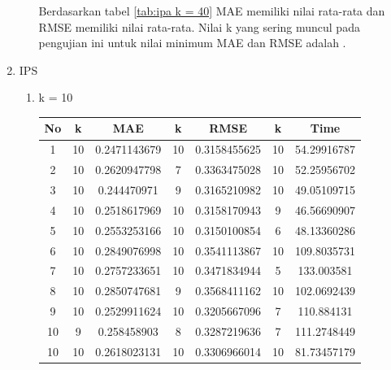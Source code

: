 \begin{enumerate}
\begin{enumerate}
                Berdasarkan tabel \ref{tab:ipa k = 40} MAE memiliki nilai rata-rata dan RMSE memiliki nilai rata-rata. Nilai k yang sering muncul pada pengujian ini untuk nilai minimum MAE dan RMSE adalah .
                
        \end{enumerate}
        
        
        
    \item IPS
        \begin{enumerate}
            \item k = 10 \\
                \begin{longtable}[H]{|c|c|c|c|c|c|c|}
                    \hline
                    No & k & MAE & k & RMSE & k & Time \\
                    \hline
                    1 & 10 & 0.2471143679 & 10 & 0.3158455625 & 10 & 54.29916787\\
                    \hline
                    2 & 10 & 0.2620947798 & 7 & 0.3363475028 & 10 & 52.25956702\\
                    \hline
                    3 & 10 & 0.244470971 & 9 & 0.3165210982 & 10 & 49.05109715\\
                    \hline
                    4 & 10 & 0.2518617969 & 10 & 0.3158170943 & 9 & 46.56690907\\
                    \hline
                    5 & 10 & 0.2553253166 & 10 & 0.3150100854 & 6 & 48.13360286\\
                    \hline
                    6 & 10 & 0.2849076998 & 10 & 0.3541113867 & 10 & 109.8035731\\
                    \hline
                    7 & 10 & 0.2757233651 & 10 & 0.3471834944 & 5 & 133.003581\\ 
                    \hline
                    8 & 10 & 0.2850747681 & 9 & 0.3568411162 & 10 & 102.0692439\\
                    \hline
                    9 & 10 & 0.2529911624 & 10 & 0.3205667096 & 7 & 110.884131\\
                    \hline
                    10 & 9 & 0.258458903 & 8 & 0.3287219636 & 7 & 111.2748449\\
                    \hline
                    10 & 10 & 0.2618023131 & 10 & 0.3306966014 & 10 & 81.73457179\\
                    \hline
                    

\end{longtable}
\end{enumerate}
\end{enumerate}
